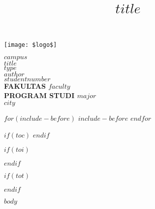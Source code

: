 \documentclass[12pt, a4paper, onecolumn, oneside, final, bahasa]{$documentclass$}
\title{$title$}
\let\origfigure\figure
\let\endorigfigure\endfigure
\renewenvironment{figure}[1][2] {
    \expandafter\origfigure\expandafter[H]
} {
    \endorigfigure
}
\begin{document}
\begin{titlepage}
    \begin{center}
        \begin{figure}
            \begin{center}
                \texttt{[image: \$logo\$]}
            \end{center}
        \end{figure}
        \vspace*{0cm}
        \textbf{$campus$} \\
        \textbf{$title$} \\[1.0cm]
        \vspace*{2.5cm}
        \textbf{$type$} \\
        \vspace*{3 cm}       
        \textbf{$author$} \\
        \textbf{$studentnumber$} \\
        \vspace*{5.0cm}
        \textbf{
            FAKULTAS $faculty$ \\
            PROGRAM STUDI $major$ \\
            $city$
        }
    \end{center}
\end{titlepage}
\setcounter{page}{2}

$for(include-before)$
    $include-before$
$endfor$

$if(toc)$
{
    \hypersetup{linkcolor=black}
    \tableofcontents
}
$endif$

$if(toi)$
    \hypersetup{linkcolor=black}
    \listoffigures
$endif$

$if(tot)$
    \hypersetup{linkcolor=black}
    \listoftables
$endif$


\newpage
{}

$body$
\end{document}
